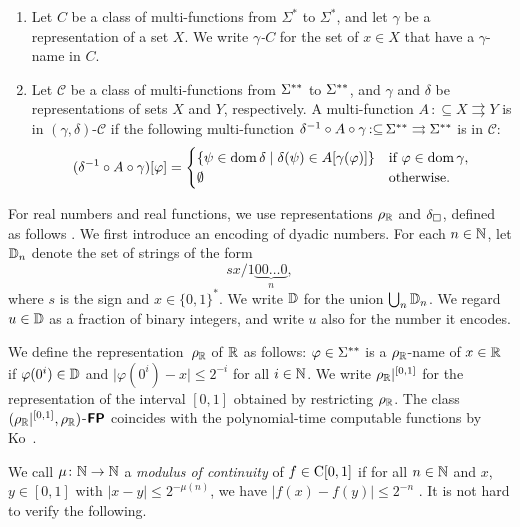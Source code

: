 \documentclass[a4paper,UKenglish]{lipics}
\newcommand{\pcolon}{\mathpunct{\,:\subseteq}}
\begin{document}
\begin{definition}
\label{definition: computation wrt representation}
\begin{enumerate}
\item 
Let $C$ be a class of multi-functions from $\Sigma ^*$ to $\Sigma ^*$, 
and let $\gamma$ be a representation of a set $X$. 
We write \emph{$\gamma$-$C$} for the set of $x \in X$
that have a $\gamma$-name in $C$.
\item 
Let $\mathcal C$ be a class of multi-functions from $\Sigma ^{**}$ to $\Sigma ^{**}$,
and $\gamma$ and $\delta$ be representations of sets $X$ and $Y$, respectively.
A multi-function $A \pcolon X \rightrightarrows Y$
is in $(\gamma, \delta)$-$\mathcal C$ if 
the following multi-function $
\delta^{-1} \circ A \circ \gamma \pcolon \LM \rightrightarrows \LM
$ is in $\mathcal C$: 
\begin{equation}
 (\delta^{-1} \circ A \circ \gamma)[\varphi] = 
  \begin{cases}
   \{\psi \in \mathop{\rm dom} \delta \mid \delta(\psi) \in A[\gamma(\varphi)] \}
   & 
   \text{if } \varphi \in \mathop{\rm dom} \gamma, 
   \\ 
   \emptyset 
   &
   \text{otherwise.}
  \end{cases}
\end{equation}
\end{enumerate}
\end{definition}

For real numbers and real functions,
we use representations $\rho _\mathbb R$ and $\delta _\square$, 
defined as follows \cite{kawamura2012complexity}. 
We first introduce an encoding of dyadic numbers.
For each $n \in \mathbb N$, let $\mathbb D_n$ denote the set of strings of the form
\begin{equation}
 sx/1\!\underbrace{00\dots0}_{n},
\end{equation}
where $s$ is the sign and $x \in \{0,1\}^*$.
We write $\mathbb D$ for the union $\bigcup _n \mathbb D _n$.
We regard $u \in \mathbb D$ as a fraction of binary integers, 
and write $u$ also for the number it encodes. 

We define the representation~$\rho _\mathbb R$ of $\mathbb R$ as follows: 
$\varphi \in \Sigma ^{**}$ is a $\rho _\mathbb R$-name of $x \in \mathbb R$ 
if $\varphi(0^i) \in \mathbb D$ and $\lvert \varphi(0^i) - x \rvert \le 2^{-i}$
for all $i \in \mathbb N$.
We write $\rho _\mathbb R|^{[0,1]}$ for the representation of the interval $[0, 1]$ 
obtained by restricting $\rho _\mathbb R$.
The class $(\rho _\mathbb R|^{[0,1]},\rho _\mathbb R)$-$\text{\bfseries \sffamily \upshape FP}$ 
coincides with 
the polynomial-time computable functions by Ko~\cite{ko1991complexity}. 

We call $\mu \colon \mathbb N \to \mathbb N$ a {\em modulus of continuity} 
of $f \in \mathrm C [0, 1]$ 
if 
for all $n \in \mathbb N$ and $x$, $y \in [0,1]$ with
$|x - y| \le 2^{-\mu(n)}$, 
we have $|f(x) - f(y)| \le 2^{-n}$ .
It is not hard to verify the following. 
\end{document}
